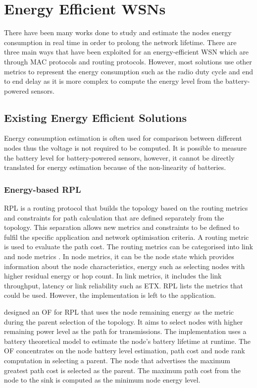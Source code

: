 \chapter{Energy Efficient WSNs}
\label{energyLoss}
There have been many works done to study and estimate the nodes energy consumption in real time in order to prolong the network lifetime. There are three main ways that have been exploited for an energy-efficient WSN which are through MAC protocols and routing protocols. However, most solutions use other metrics to represent the energy consumption such as the radio duty cycle and end to end delay as it is more complex to compute the energy level from the battery-powered sensors. 

\section{Existing Energy Efficient Solutions}
Energy consumption estimation is often used for comparison between different nodes thus the voltage is not required to be computed. It is possible to measure the battery level for battery-powered sensors, however, it cannot be directly translated for energy estimation because of the non-linearity of batteries.

\subsection{Energy-based RPL}
RPL is a routing protocol that builds the topology based on the routing metrics and constraints for path calculation that are defined separately from the topology. This separation allows new metrics and constraints to be defined to fulfil the specific application and network optimisation criteria. A routing metric is used to evaluate the path cost. The routing metrics can be categorised into link and node metrics \cite{routingmetrics}. In node metrics, it can be the node state which provides information about the node characteristics, energy such as selecting nodes with higher residual energy or hop count. In link metrics, it includes the link throughput, latency or link reliability such as ETX. RPL lists the metrics that could be used. However, the implementation is left to the application. 

\cite{energyrpl} designed an OF for RPL that uses the node remaining energy as the metric during the parent selection of the topology. It aims to select nodes with higher remaining power level as the path for transmissions. The implementation uses a battery theoretical model \cite{sensornets13} to estimate the node's battery lifetime at runtime. The OF concentrates on the node battery level estimation, path cost and node rank computation in selecting a parent. The node that advertises the maximum greatest path cost is selected as the parent. The maximum path cost from the node to the sink is computed as the minimum node energy level. 

